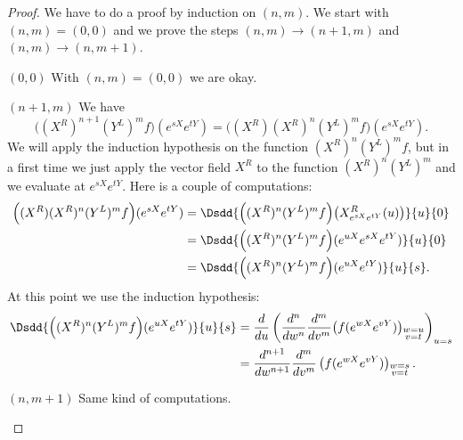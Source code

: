 \begin{proof}
    We have to do a proof by induction on \( (n,m)\). We start with \( (n,m)=(0,0)\) and we prove the steps \( (n,m)\to (n+1,m)\) and \( (n,m)\to (n,m+1)\).

    \begin{subproof}
        \item[\( (0,0)\)]
            With \( (n,m)=(0,0)\) we are okay.
        \item[\( (n+1,m)\)]
            We have
            \begin{equation}
                \Big( (X^R)^{n+1}(Y^L)^mf \Big)( e^{sX} e^{tY})=\big( (X^R)(X^R)^n(Y^L)^mf \big)( e^{sX} e^{tY}).
            \end{equation}
            We will apply the induction hypothesis on the function \( (X^R)^n(Y^L)^mf\), but in a first time we just apply the vector field \( X^R\) to the function \( (X^R)^n(Y^L)^m\) and we evaluate at \(  e^{sX} e^{tY}\). Here is a couple of computations:
            \begin{subequations}
                \begin{align}
                    \Big( (X^R)(X^R)^n(Y^L)^mf \Big)( e^{sX} e^{tY})&=\Dsdd{  \Big( (X^R)^n(Y^L)^mf \Big)\big( X^R_{ e^{sX} e^{tY}}(u) \big)  }{u}{0}\\
                    &=\Dsdd{  \Big( (X^R)^n(Y^L)^mf \Big)(  e^{uX} e^{sX} e^{tY} )  }{u}{0}\\
                    &=\Dsdd{  \Big( (X^R)^n(Y^L)^mf \Big)( e^{uX} e^{tY})  }{u}{s}.
                \end{align}
            \end{subequations}
            At this point we use the induction hypothesis:
            \begin{subequations}
                \begin{align}
                    \Dsdd{  \Big( (X^R)^n(Y^L)^mf \Big)( e^{uX} e^{tY})  }{u}{s}&=\frac{ d }{ du }\left( \frac{ d^n }{ dw^n }\frac{ d^m }{ dv^m }\big( f( e^{wX} e^{vY}) \big)_{\substack{w=u\\v=t}}  \right)_{u=s}\\
                    &=\frac{ d^{n+1} }{ dw^{n+1} }\frac{ d^m }{ dv^m }\left( f( e^{wX} e^{vY}) \right)_{\substack{w=s\\v=t}}.
                \end{align}
            \end{subequations}
        \item[\( (n,m+1)\)]
            Same kind of computations.
    \end{subproof}
\end{proof}

